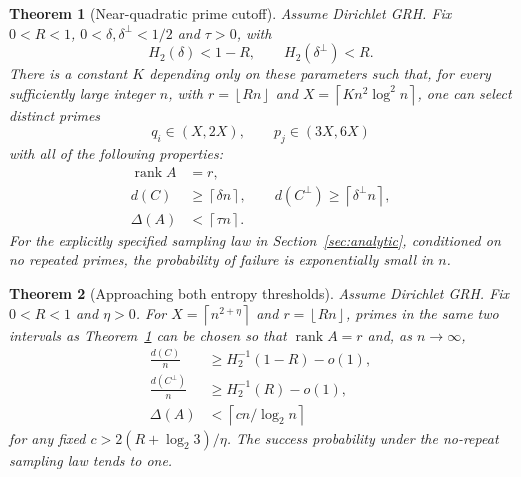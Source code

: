 \documentclass[11pt]{article}
\newtheorem{theorem}{Theorem}[section]
\theoremstyle{remark}\newtheorem{remark}[theorem]{Remark}
\newcommand{\rank}{\operatorname{rank}}
\newcommand{\Hbin}{H_2}
\newcommand{\floor}[1]{\left\lfloor #1\right\rfloor}
\newcommand{\ceil}[1]{\left\lceil #1\right\rceil}
\begin{document}
\begin{theorem}[Near-quadratic prime cutoff]\label{thm:main}
Assume Dirichlet GRH. Fix $0<R<1$, $0<\delta,\delta^\perp<1/2$ and $\tau>0$, with
\begin{equation}\label{eq:entropy}
 \Hbin(\delta)<1-R,\qquad \Hbin(\delta^\perp)<R.
\end{equation}
There is a constant $K$ depending only on these parameters such that, for every sufficiently large integer $n$, with $r=\floor{Rn}$ and $X=\ceil{Kn^2\log^2 n}$, one can select distinct primes
\[
 q_i\in(X,2X),\qquad p_j\in(3X,6X)
\]
with all of the following properties:
\begin{align*}
 \rank A&=r,\\
 d(C)&\ge\ceil{\delta n},\qquad d(C^\perp)\ge\ceil{\delta^\perp n},\\
 \Delta(A)&<\ceil{\tau n}.
\end{align*}
For the explicitly specified sampling law in Section~\ref{sec:analytic}, conditioned on no repeated primes, the probability of failure is exponentially small in $n$.
\end{theorem}

\begin{theorem}[Approaching both entropy thresholds]\label{thm:limit}
Assume Dirichlet GRH. Fix $0<R<1$ and $\eta>0$. For $X=\ceil{n^{2+\eta}}$ and $r=\floor{Rn}$, primes in the same two intervals as Theorem~\ref{thm:main} can be chosen so that $\rank A=r$ and, as $n\to\infty$,
\begin{align*}
 \frac{d(C)}n &\ge \Hbin^{-1}(1-R)-o(1),\\
 \frac{d(C^\perp)}n &\ge \Hbin^{-1}(R)-o(1),\\
 \Delta(A)&<\ceil{c n/\log_2 n}
\end{align*}
for any fixed $c>2(R+\log_2 3)/\eta$. The success probability under the no-repeat sampling law tends to one.
\end{theorem}
\end{document}
